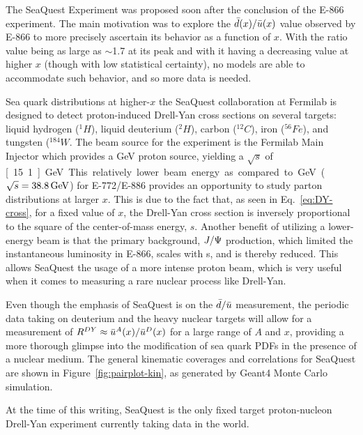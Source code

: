 The SeaQuest Experiment was proposed soon after the conclusion of the E-866 experiment. The main motivation was to explore the $\bar{d}(x)/\bar{u}(x)$ value observed by E-866 to more precisely ascertain its behavior as a function of $x$. With the ratio value being as large as $\sim$1.7 at its peak and with it having a decreasing value at higher $x$ (though with low statistical certainty), no models are able to accommodate such behavior, and so more data is needed. 

Sea quark distributions at higher-$x$ the SeaQuest collaboration at Fermilab is designed to detect proton-induced Drell-Yan cross sections on several targets: liquid hydrogen ($^1H$), liquid deuterium ($^2H$), carbon ($^{12}C$), iron ($^{56}Fe$), and tungsten ($^{184}W$. The beam source for the experiment is the Fermilab Main Injector which provides a \unit[120]{GeV} proton source, yielding a $\sqrt{s}$ of \unit[15.1]{GeV}. This relatively lower beam energy as compared to \unit[800]{GeV} ($\sqrt{s}=\unit[38.8]{GeV}$) for E-772/E-886 provides an opportunity to study parton distributions at larger $x$. This is due to the fact that, as seen in Eq.~\ref{eq:DY-cross}, for a fixed value of $x$, the Drell-Yan cross section is inversely proportional to the square of the center-of-mass energy, $s$. Another benefit of utilizing a lower-energy beam is that the primary background, $J/\Psi$ production, which limited the instantaneous luminosity in E-866, scales with s, and is thereby reduced. This allows SeaQuest the usage of a more intense proton beam, which is very useful when it comes to measuring a rare nuclear process like Drell-Yan.

Even though the emphasis of SeaQuest is on the $\bar{d}/\bar{u}$ measurement, the periodic data taking on deuterium and the heavy nuclear targets will allow for a measurement of $R^{DY}\approx\bar{u}^A(x)/\bar{u}^D(x)$ for a large range of $A$ and $x$, providing a more thorough glimpse into the modification of sea quark PDFs in the presence of a nuclear medium. The general kinematic coverages and correlations for SeaQuest are shown in Figure~\ref{fig:pairplot-kin}, as generated by Geant4 Monte Carlo simulation.

At the time of this writing, SeaQuest is the only fixed target proton-nucleon Drell-Yan experiment currently taking data in the world.

